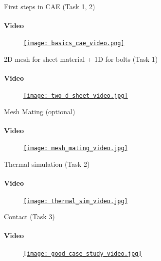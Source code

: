 \documentclass[aspectratio=169]{beamer}
\begin{document}
\begin{frame}[t]{First steps in CAE (Task 1, 2)}
    \framesubtitle{Video}
    \vspace{-0.6cm}
    \begin{figure}[H]
        \href{https://disk.yandex.ru/i/zj26vr7Uk03ilA}{
            \centering\texttt{[image: basics\_cae\_video.png]}}
        \label{fig:basics_cae_video.png}
    \end{figure}
\end{frame}

\begin{frame}[t]{2D mesh for sheet material + 1D for bolts (Task 1)}
    \framesubtitle{Video}
    \vspace{-0.6cm}
    \begin{figure}[H]
        \href{https://www.youtube.com/watch?v=3hZTIqXxq1o}{
            \centering\texttt{[image: two\_d\_sheet\_video.jpg]}}
        \label{fig:two_d_sheet_video.jpg}
    \end{figure}
\end{frame}

\begin{frame}[t]{Mesh Mating (optional)}
    \framesubtitle{Video}
    \vspace{-0.6cm}
    \begin{figure}[H]
        \href{https://youtu.be/mHD2vp394AI}{
            \centering\texttt{[image: mesh\_mating\_video.jpg]}}
        \label{fig:mesh_mating_video.jpg}
    \end{figure}
\end{frame}

\begin{frame}[t]{Thermal simulation (Task 2)}
    \framesubtitle{Video}
    \vspace{-0.6cm}
    \begin{figure}[H]
        \href{https://youtu.be/mLqTBOaz9-w}{
            \centering\texttt{[image: thermal\_sim\_video.jpg]}}
        \label{fig:thermal_sim_video.jpg}
    \end{figure}
\end{frame}

\begin{frame}[t]{Contact (Task 3)}
    \framesubtitle{Video}
    \vspace{-0.6cm}
    \begin{figure}[H]
        \href{https://youtu.be/2SoCy4tP74g}{
            \centering\texttt{[image: good\_case\_study\_video.jpg]}}
        \label{fig:good_case_study_video.jpg}
    \end{figure}
\end{frame}
\end{document}
